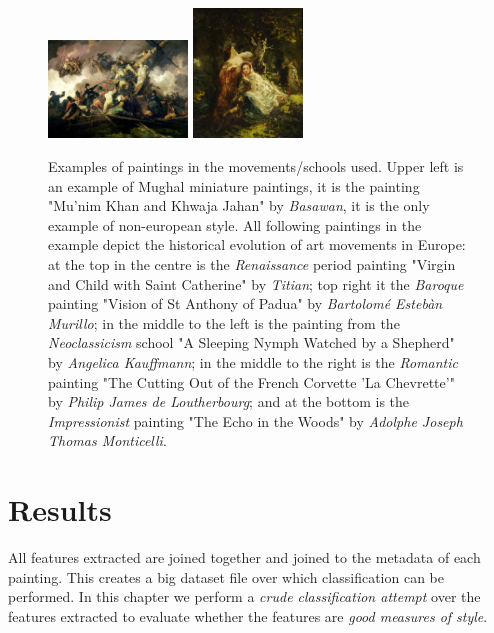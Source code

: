 \documentclass[11pt,a4paper,twoside,openright]{report}
\begin{document}
\begin{figure}[tbp]
\includegraphics[width=0.33\textwidth]{loutherbourg_k264}
\includegraphics[width=0.26\textwidth]{monticelli_300}
\caption[Examples of paintings in art movements/schools]{Examples of paintings
in the movements/schools used.  Upper left is an example of Mughal miniature
paintings, it is the painting "Mu'nim Khan and Khwaja Jahan" by \emph{Basawan},
it is the only example of non-european style.  All following paintings in the
example depict the historical evolution of art movements in Europe: at the top
in the centre is the \emph{Renaissance} period painting "Virgin and Child with
Saint Catherine" by \emph{Titian};  top right it the \emph{Baroque} painting
"Vision of St Anthony of Padua" by \emph{Bartolom\'e Esteb\`an Murillo};  in
the middle to the left is the painting from the \emph{Neoclassicism} school "A
Sleeping Nymph Watched by a Shepherd" by \emph{Angelica Kauffmann}; in the
middle to the right is the \emph{Romantic} painting "The Cutting Out of the
French Corvette 'La Chevrette'" by \emph{Philip James de Loutherbourg}; and at
the bottom is the \emph{Impressionist} painting "The Echo in the Woods" by
\emph{Adolphe Joseph Thomas Monticelli}.}
\label{fig:styles}
\end{figure}


\chapter{Results}
\label{chap:results}

All features extracted are joined together and joined to the metadata of each
painting.  This creates a big dataset file over which classification can be
performed.  In this chapter we perform a \emph{crude classification attempt}
over the features extracted to evaluate whether the features are \emph{good
measures of style}. 
\end{document}
